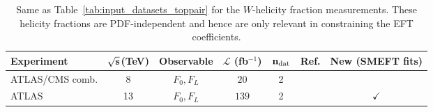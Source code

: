\begin{table}[H]
  \begin{center}
{\fontsize{7pt}{7pt}\selectfont
  \centering
   \renewcommand{\arraystretch}{1.5}
   \setlength{\tabcolsep}{2pt}
   \begin{tabular}{lccccc|c}
     \toprule \textbf{Experiment}     & $\bf{\sqrt{s}}$\textbf{(TeV)}
     &   \textbf{Observable} & $\mathcal{L}$ (fb${}^{-1}$) & $\mathbf{n_{\rm dat}}$ & \textbf{Ref.}   
    &  \textbf{New (SMEFT fits)} \\
     \toprule
           ATLAS/CMS comb.
      & 8
      & $F_0, F_L$
      & $20$
      & 2
      & \cite{Aad:2020jvx}
      &  \\
 \midrule
       ATLAS
      & 13
      & $F_0, F_L$
      & $139$
      & 2
      & \cite{ATLAS:2022bdg}
      & $\checkmark$     \\
\bottomrule
   \end{tabular}
   \vspace{0.3cm}
  \caption{\small Same as Table~\ref{tab:input_datasets_toppair} for
    the $W$-helicity fraction measurements.
    These helicity fractions are PDF-independent and hence
    are only relevant in constraining the EFT coefficients.
    \label{tab:whelicities}
   \label{tab:input_datasets_helicityfractions}
}
}
\end{center}
\end{table}
